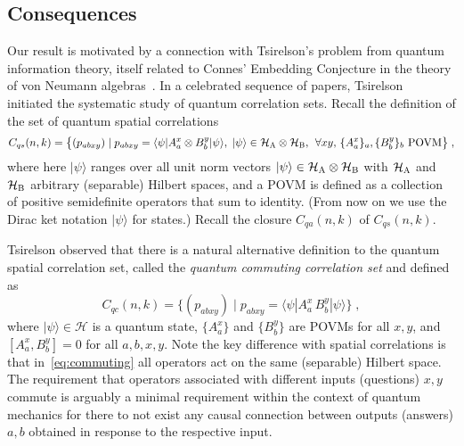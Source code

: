 \documentclass[11pt]{article}
\theoremstyle{definition}
\newcommand{\ket}[1]{|#1\rangle}
\newcommand{\bra}[1]{\langle#1|}
\newcommand{\mH}{\ensuremath{\mathcal{H}}}
\newcommand{\labelstyle}[1]{\ensuremath{\textsc{#1}}\xspace}
\newcommand{\alice}{\labelstyle{A}}
\newcommand{\bob}{\labelstyle{B}}
\newcommand{\class}[1]{\ensuremath{\mathsf{#1}}\xspace}
\newcommand{\MIP}{\class{MIP}} %
\begin{document}
	

\subsection{Consequences}
\label{sec:consequences}

	Our result is motivated by a connection with Tsirelson's problem from quantum information theory, itself related to Connes' Embedding Conjecture in the theory of von Neumann algebras~\cite{connes1976classification}. 
In a celebrated sequence of papers, Tsirelson~\cite{tsirelson1993some} initiated the systematic study of quantum correlation sets. Recall the definition of the set of quantum spatial correlations 
\begin{equation}
\label{eq:spatial}
	C_{qs}(n,k) = \big\{ (p_{abxy} ) \mid p_{abxy} = \bra{\psi} A^x_a \otimes B^y_b \ket{\psi}, \; \ket{\psi} \in  \mH_\alice \otimes \mH_\bob,\,\;\forall xy,\, \{A^x_a\}_a,\{B^y_b\}_b\text{ POVM}\big\}\;,
\end{equation}
where here $\ket{\psi}$ ranges over all unit norm vectors $\ket{\psi} \in \mH_\alice \otimes \mH_\bob$ with $\mH_\alice$ and $\mH_\bob$ arbitrary (separable) Hilbert spaces, and a POVM is defined as a collection of positive semidefinite operators that sum to identity. (From now on we use the Dirac ket notation $\ket{\psi}$ for states.) Recall the closure $C_{qa}(n,k)$ of $C_{qs}(n,k)$.

Tsirelson observed that there is a natural alternative definition to the quantum
spatial correlation set, called the \emph{quantum commuting correlation set} and
defined as
\begin{equation}
  \label{eq:commuting}
  C_{qc}(n,k) = \bigl\{ (p_{abxy}) \mid p_{abxy} = \bra{\psi} A^x_a\,  B^y_b
  \ket{\psi} \bigr\}\;,
\end{equation}
where $\ket{\psi}\in \mH$ is a quantum state, $\{A^x_a\}$ and $\{B^y_b\}$ are
POVMs for all $x, y$, and $[A^x_a, B^y_b] = 0$ for all $a, b, x, y$.
Note the key difference with spatial correlations is that
in~\eqref{eq:commuting} all operators act on the same (separable) Hilbert space.
The requirement that operators associated with different inputs (questions)
$x,y$ commute is arguably a minimal requirement within the context of quantum
mechanics for there to not exist any causal connection between outputs (answers)
$a,b$ obtained in response to the respective input.
\end{document}
